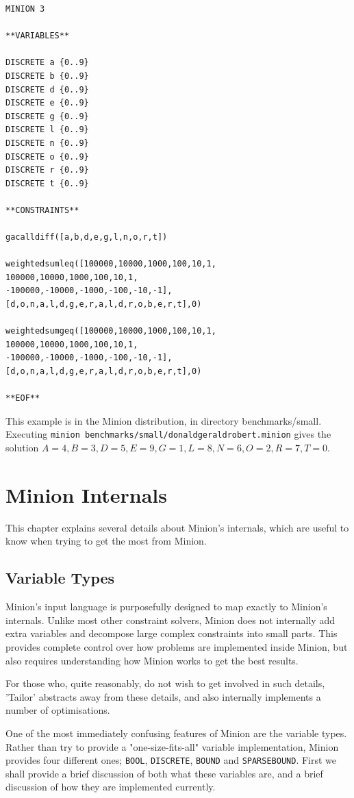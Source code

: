 \documentclass[oneside]{book}
\newcommand{\BOOL}{\texttt{BOOL}\xspace}
\newcommand{\DISCRETE}{\texttt{DISCRETE}\xspace}
\newcommand{\BOUND}{\texttt{BOUND}\xspace}
\newcommand{\SPARSEBOUND}{\texttt{SPARSEBOUND}\xspace}
\begin{document}
\begin{verbatim}
MINION 3

**VARIABLES**

DISCRETE a {0..9}
DISCRETE b {0..9}
DISCRETE d {0..9}
DISCRETE e {0..9}
DISCRETE g {0..9}
DISCRETE l {0..9}
DISCRETE n {0..9}
DISCRETE o {0..9}
DISCRETE r {0..9}
DISCRETE t {0..9}

**CONSTRAINTS**

gacalldiff([a,b,d,e,g,l,n,o,r,t])

weightedsumleq([100000,10000,1000,100,10,1,
100000,10000,1000,100,10,1,
-100000,-10000,-1000,-100,-10,-1],
[d,o,n,a,l,d,g,e,r,a,l,d,r,o,b,e,r,t],0)

weightedsumgeq([100000,10000,1000,100,10,1,
100000,10000,1000,100,10,1,
-100000,-10000,-1000,-100,-10,-1],
[d,o,n,a,l,d,g,e,r,a,l,d,r,o,b,e,r,t],0)

**EOF**
\end{verbatim}

This example is in the Minion distribution, in directory benchmarks/small.
Executing \texttt{minion benchmarks/small/donaldgeraldrobert.minion}
gives the solution $A=4, B=3, D=5, E=9, G=1,
L=8, N=6, O=2, R=7, T=0.$

\chapter{Minion Internals}

This chapter explains several details about Minion's internals, which are useful to know when trying to get the most from Minion.

\section{Variable Types}

Minion's input language is purposefully designed to map exactly to Minion's internals. Unlike most other constraint solvers, Minion does not internally add extra variables and decompose large complex constraints into small parts. This provides complete control over how problems are implemented inside Minion, but also requires understanding how Minion works to get the best results.

For those who, quite reasonably, do not wish to get involved in such details, 'Tailor' abstracts away from these details, and also internally implements a number of optimisations.

One of the most immediately confusing features of Minion are the variable types. Rather than try to provide a "one-size-fits-all" variable implementation, Minion provides four different ones; \BOOL, \DISCRETE, \BOUND and \SPARSEBOUND.  First we shall provide a brief discussion of both what these variables are, and a brief discussion of how they are implemented currently.
\end{document}
